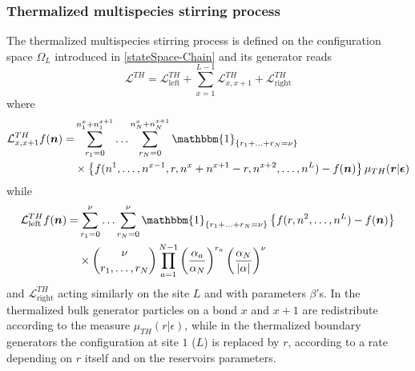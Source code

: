 \documentclass[10pt]{article}
\numberwithin{equation}{section}
\numberwithin{equation}{subsection}
\begin{document}
\subsubsection{Thermalized multispecies stirring process}
The thermalized multispecies stirring process is defined on the configuration space $\Omega_{L}$ introduced in \eqref{stateSpace-Chain} and its generator reads
\begin{equation}\label{thermalizedGenerator}
	\mathcal{L}^{TH}=\mathcal{L}_{\text{left}}^{TH}+\sum_{x=1}^{L-1}\mathcal{L}_{x,x+1}^{TH}+\mathcal{L}_{\text{right}}^{TH}
\end{equation}
where 
\begin{equation}\label{bulkThermalized}
	\begin{split}
	\mathcal{L}_{x,x+1}^{TH}f(\bm{n})=&\sum_{r_{1}=0}^{n_{1}^{x}+n_{1}^{x+1}}\ldots\sum_{r_{N}=0}^{n_{N}^{x}+n_{N}^{x+1}}\mathbbm{1}_{\{r_{1}+\ldots+r_{N}=\nu\}}
	\\&\times
	\left\{f(n^{1},\ldots,n^{x-1},r,n^{x}+n^{x+1}-r,n^{x+2},\ldots,n^{L})-f(\bm{n})\right\}\mu_{TH}(\bm{r}|\bm{\epsilon})
	\end{split}
\end{equation}
while
\begin{equation}\label{boundaryThermalized}
	\begin{split}
		\mathcal{L}_{\text{left}}^{TH}f(\bm{n})=&\sum_{r_{1}=0}^{\nu}\ldots\sum_{r_{N}=0}^{\nu}\mathbbm{1}_{\{r_{1}+\ldots+r_{N}=\nu\}}\left\{f(r,n^{2},\ldots,n^{L})-f(\bm{n})\right\}\\&\times
		\binom{\nu}{r_{1},\ldots, r_{N}}\prod_{a=1}^{N-1}\left(\frac{\alpha_{a}}{\alpha_{N}}\right)^{r_{a}}\left(\frac{\alpha_{N}}{|\alpha|}\right)^{\nu}
		\end{split}
	\end{equation} 
and $\mathcal{L}_{\text{right}}^{TH}$ acting similarly on the site $L$ and with parameters $\beta$'s. 
In the thermalized bulk generator particles on a bond $x$ and $x+1$ are redistribute according to the measure $\mu_{TH}(r|\epsilon)$, while in the thermalized boundary generators the configuration at site $1$ ($L$) is replaced by $r$, according to a rate depending on $r$ itself and on the reservoirs parameters. 
\end{document}
